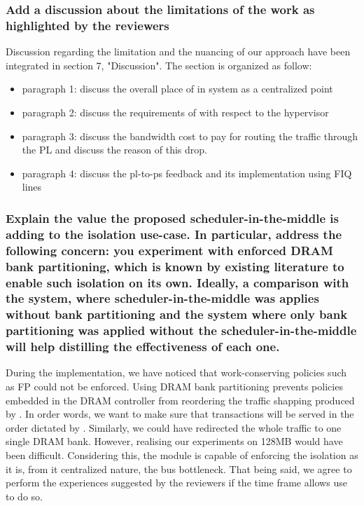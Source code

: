         \subsubsection{Add a discussion about the limitations of the work as highlighted by the reviewers}
            Discussion regarding the limitation and the nuancing of our approach have been integrated in section 7, "Discussion".
            The section is organized as follow:
            \begin{itemize}
                \item paragraph 1: discuss the overall place of \schim in system as a centralized point
                \item paragraph 2: discuss the requirements of \schim with respect to the hypervisor
                \item paragraph 3: discuss the bandwidth cost to pay for routing the traffic through the PL and discuss the reason of this drop.
                \item paragraph 4: discuss the pl-to-ps feedback and its implementation using FIQ lines
            \end{itemize}

        \subsubsection{Explain the value the proposed scheduler-in-the-middle is adding to the isolation use-case. In particular, address the following concern: you experiment with enforced DRAM bank partitioning, which is known by existing literature to enable such isolation on its own. Ideally, a comparison with the system, where scheduler-in-the-middle was applies without bank partitioning and the system where only bank partitioning was applied without the scheduler-in-the-middle will help distilling the effectiveness of each one.}
        During the implementation, we have noticed that work-conserving policies such as FP could not be enforced.
        Using DRAM bank partitioning prevents policies embedded in the DRAM controller from reordering the traffic shapping produced by \schim.
        In order words, we want to make sure that transactions will be served in the order dictated by \schim.
        Similarly, we could have redirected the whole traffic to one single DRAM bank. However, realising our experiments on 128MB would have been difficult.
        Considering this, the \schim module is capable of enforcing the isolation as it is, from it centralized nature, the bus bottleneck.
        That being said, we agree to perform the experiences suggested by the reviewers if the time frame allows use to do so.

